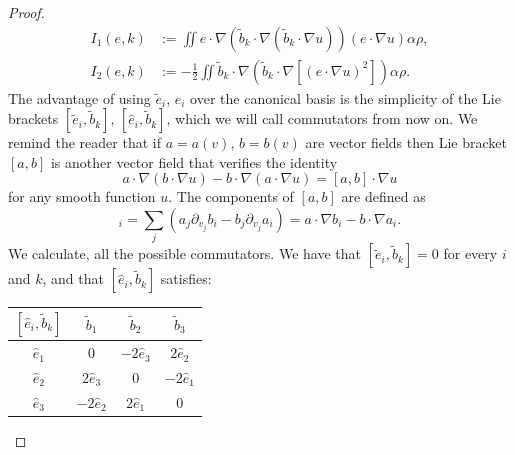 \documentclass[11pt]{amsart}
\numberwithin{equation}{section}
\begin{document}
\begin{proof}
\begin{align*}
  I_{1}(e,k) & :=\iint e\cdot\nabla\left(\tilde{b}_{k}\cdot\nabla\left(\tilde{b}_{k}\cdot\nabla u\right)\right)\left(e\cdot\nabla u\right)\alpha \rho,\\
  I_{2}(e,k) & :=-\frac{1}{2}\iint\tilde{b}_{k}\cdot\nabla\left(\tilde{b}_{k}\cdot\nabla\left[(e\cdot\nabla u)^{2}\right]\right)\alpha\rho.
\end{align*}
% 
The advantage of using $\tilde{e}_{i}$, $\hat{e}_{i}$ over the canonical basis is the simplicity of the Lie brackets $[\tilde e_i,\tilde b_k]$, $[\hat e_i,\tilde b_k]$, which we will call commutators from now on. We remind the reader that if $a=a(v)$, $b=b(v)$ are vector fields then Lie bracket $[a,b]$ is another vector field that verifies the identity
%
\begin{equation*}
  a\cdot\nabla\left(b\cdot\nabla u\right)-b\cdot\nabla\left(a\cdot\nabla u\right)=[a,b]\cdot\nabla u
\end{equation*}
%
for any smooth function $u$. The components of $[a,b]$ are defined as
%
\begin{equation*}
  [a,b]_{i}=\sum_{j}\left(a_{j}\partial_{v_{j}}b_{i}-b_{j}\partial_{v_{j}}a_{i}\right)=a\cdot\nabla b_{i}-b\cdot\nabla a_{i}.
\end{equation*}
%
We calculate, all the possible commutators. We have that $[\tilde e_i,\tilde b_k]=0$ for every $i$ and $k$, and that $[\hat e_i,\tilde b_k]$ satisfies:
  \vspace*{-2mm}
  \begin{table}[h!]
    \centering%
    \begin{tabular}{c|c|c|c} 
      $[\hat{e}_{i},\tilde{b}_{k}]$ & $\tilde{b}_{1}$ & $\tilde{b}_{2}$ & $\tilde{b}_{3}$\tabularnewline
      \hline 
      $\hat{e}_{1}$ & $0$ & $-2\hat{e}_{3}$ & $2\hat{e}_{2}$\tabularnewline
      \hline 
      $\hat{e}_{2}$ & $2\hat{e}_{3}$ & $0$ & $-2\hat{e}_{1}$\tabularnewline
      \hline 
      $\hat{e}_{3}$ & $-2\hat{e}_{2}$ & $2\hat{e}_{1}$ & $0$\tabularnewline
    \end{tabular}
  \end{table}
  \vspace*{-2mm}


\end{proof}
\end{document}
